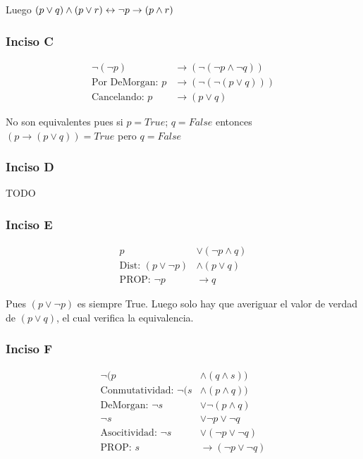 Luego $(p\vee q) \wedge (p\vee r) \leftrightarrow \neg p \rightarrow (p \wedge r)$

\subsubsection{Inciso C}

\begin{align*}
    \neg(\neg p) &\rightarrow (\neg (\neg p \wedge \neg q)) \\
    \text{Por DeMorgan: }p &\rightarrow (\neg (\neg (p \vee q))) \\
    \text{Cancelando: }p &\rightarrow (p \vee q)
\end{align*}

No son equivalentes pues si $p = True$; $q = False$ entonces $(p \rightarrow (p \vee q)) = True$ pero $q = False$

\subsubsection{Inciso D}
TODO

\subsubsection{Inciso E}

\begin{align*}
    p &\vee (\neg p \wedge q)\\
    \text{Dist: }(p \vee \neg p) &\wedge (p \vee q) \\
    \text{PROP: }\neg p &\rightarrow q
\end{align*}

Pues $(p \vee \neg p)$ es siempre True. Luego solo hay que averiguar el valor de verdad de $(p \vee q)$, el cual verifica
la equivalencia.

\subsubsection{Inciso F}

\begin{align*}
    \neg (p &\wedge (q \wedge s)) \\
    \text{Conmutatividad: }\neg (s &\wedge (p \wedge q)) \\
    \text{DeMorgan: }\neg s &\vee \neg (p\wedge q) \\
    \neg s &\vee \neg p \vee \neg q \\
    \text{Asocitividad: }\neg s &\vee (\neg p \vee \neg q) \\
    \text{PROP: }s &\rightarrow (\neg p \vee \neg q)
\end{align*}

